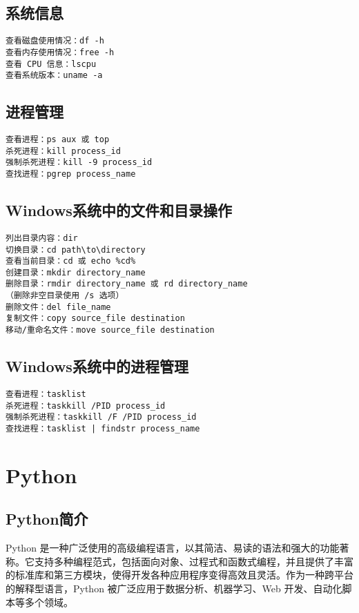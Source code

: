 \documentclass[a4paper, 12pt]{article}
\begin{document}
\subsection{系统信息}
\begin{lstlisting}
查看磁盘使用情况：df -h
查看内存使用情况：free -h
查看 CPU 信息：lscpu
查看系统版本：uname -a
\end{lstlisting}

\subsection{进程管理}
\begin{lstlisting}
查看进程：ps aux 或 top
杀死进程：kill process_id
强制杀死进程：kill -9 process_id
查找进程：pgrep process_name
\end{lstlisting}

\subsection{Windows系统中的文件和目录操作}
\begin{lstlisting}
列出目录内容：dir
切换目录：cd path\to\directory
查看当前目录：cd 或 echo %cd%
创建目录：mkdir directory_name
删除目录：rmdir directory_name 或 rd directory_name
（删除非空目录使用 /s 选项）
删除文件：del file_name
复制文件：copy source_file destination
移动/重命名文件：move source_file destination
\end{lstlisting}

\subsection{Windows系统中的进程管理}
\begin{lstlisting}
查看进程：tasklist
杀死进程：taskkill /PID process_id
强制杀死进程：taskkill /F /PID process_id
查找进程：tasklist | findstr process_name
\end{lstlisting}

\newpage
\section{Python}
\subsection{Python简介}
Python 是一种广泛使用的高级编程语言，以其简洁、易读的语法和强大的功能著称。它支持多种编程范式，包括面向对象、过程式和函数式编程，并且提供了丰富的标准库和第三方模块，使得开发各种应用程序变得高效且灵活。作为一种跨平台的解释型语言，Python 被广泛应用于数据分析、机器学习、Web 开发、自动化脚本等多个领域。
\end{document}
